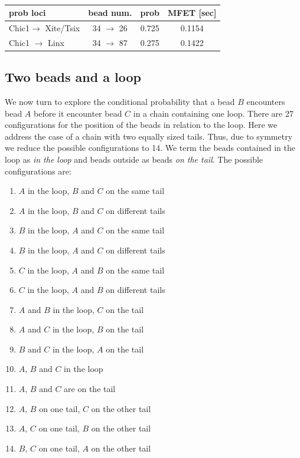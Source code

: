 \documentclass[12pt]{book}
\begin{document}
\begin{table}[H]

\begin{tabular}{l | c| c| c|}
 prob loci & bead num. &prob & MFET [sec]\\
\hline
 Chic1$\rightarrow$ Xite/Tsix & 34 $\rightarrow$ 26   & 0.725 & 0.1154\\
 Chic1 $\rightarrow$ Linx     & 34 $\rightarrow$ 87  & 0.275 & 0.1422	
 \end{tabular}
 \caption{}\label{table_conditionalEncounterDynamicLoop}
\end{table}

\subsection{Two beads and a loop}\label{subsection_conditionalEncounter2BeadsAndALoop}
We now turn to explore the conditional probability that a bead $B$ encounters bead $A$ before it encounter bead $C$ in a chain containing one loop. There are 27 configurations for the position of the beads in relation to the loop. Here we address the case of a chain with two equally sized tails. Thus, due to symmetry we reduce the possible configurations to 14. We term the beads contained in the loop as \textit{in the loop} and beads outside as beads \textit{on the tail}. The possible configurations are: 
\begin{enumerate}
 \itemsep1pt  \parskip1pt 
\item $A$ in the loop, $B$ and $C$ on the same tail
\item $A$ in the loop, $B$ and $C$ on different tails
\item $B$ in the loop, $A$ and $C$ on the same tail
\item $B$ in the loop, $A$ and $C$ on different tails
\item $C$ in the loop, $A$ and $B$ on the same tail 
\item $C$ in the loop, $A$ and $B$ on different tails 
\item $A$ and $B$ in the loop, $C$ on the tail 
\item $A$ and $C$ in the loop, $B$ on the tail 
\item $B$ and $C$ in the loop, $A$ on the tail 
\item $A$, $B$ and $C$ in the loop
\item $A$, $B$ and $C$ are on the tail
\item $A$, $B$ on one tail, $C$ on the other tail
\item $A$, $C$ on one tail, $B$ on the other tail
\item $B$, $C$ on one tail, $A$ on the other tail
\end{enumerate}
\end{document}

